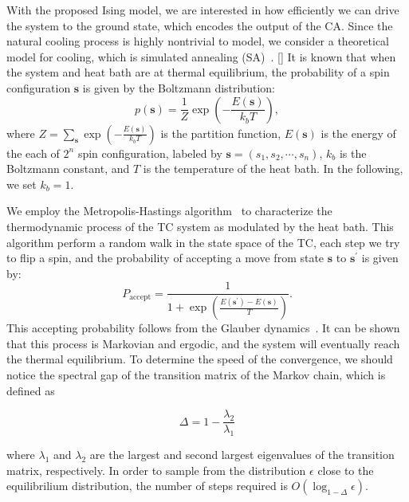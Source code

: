 \documentclass[twocolumn,superscriptaddress,english,showpacs,longbibliography]{revtex4-2}
\newcommand{\jinguo}[1]{[{\color{blue}{JGL: #1}}]}
\begin{document}
With the proposed Ising model, we are interested in how efficiently we can drive the system to the ground state, which encodes the output of the CA.
Since the natural cooling process is highly nontrivial to model, we consider a theoretical model for cooling, which is simulated annealing (SA)~\cite{Kirkpatrick1983}.
\jinguo{random fluctuations may be linear in time considering the parallelism of the system.}
It is known that when the system and heat bath are at thermal equilibrium, 
the probability of a spin configuration $\mathbf{s}$ is given by the Boltzmann distribution:
\begin{equation}
    p(\mathbf{s}) = \frac{1}{Z}\exp\left(- \frac{E({\mathbf{s}})}{k_bT}\right),
\end{equation}
where $Z = \sum_{\mathbf{s}} \exp\left(-\frac{E({\mathbf{s}})}{k_bT}\right)$ is the partition function, 
$E({\mathbf{s}})$ is the energy of the each of $2^n$ spin configuration, labeled by $\mathbf{s} = (s_1, s_2, \cdots, s_n)$, $k_b$ is the Boltzmann constant, and $T$ is the temperature of the heat bath. 
In the following, we set $k_b = 1$.

We employ the Metropolis-Hastings algorithm~\cite{metropolis1953equation} to characterize the thermodynamic process of the TC system as modulated by the heat bath.
This algorithm perform a random walk in the state space of the TC, each step we try to flip a spin,
and the probability of accepting a move from state $\mathbf{s}$ to $\mathbf{s}^\prime$ is given by:
\begin{equation}
    P_{\text{accept}} = \frac{1}{1+\exp\left(\frac{E({\mathbf{s}^\prime}) - E({\mathbf{s}})}{T}\right)}.
\end{equation}
This accepting probability follows from the Glauber dynamics~\cite{glauber1963time}.
It can be shown that this process is Markovian and ergodic, and the system will eventually reach the thermal equilibrium.
To determine the speed of the convergence, we should notice the spectral gap of the transition matrix of the Markov chain, which is defined as

\begin{equation}
    \Delta = 1 - \frac{\lambda_2}{\lambda_1}
\end{equation}

where $\lambda_1$ and $\lambda_2$ are the largest and second largest eigenvalues of the transition matrix, respectively.
In order to sample from the distribution $\epsilon$ close to the equilibrilium distribution, the number of steps required is $O(\log_{1-\Delta} \epsilon)$.
\end{document}
